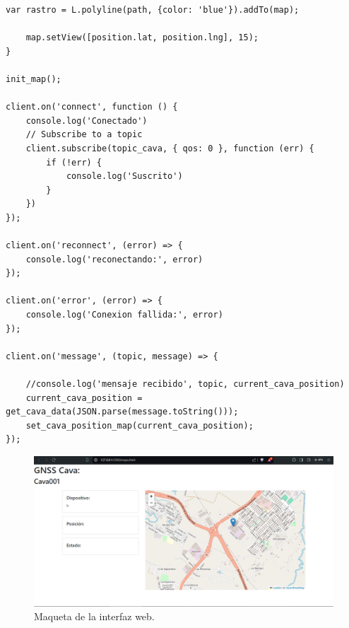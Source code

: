 \begin{lstlisting}[label=cod:aplicacion_web_js, caption=Implementación en javascript de la parte dinámica de la página web.]
    var rastro = L.polyline(path, {color: 'blue'}).addTo(map);

    map.setView([position.lat, position.lng], 15);
}

init_map();

client.on('connect', function () {
    console.log('Conectado')
    // Subscribe to a topic
    client.subscribe(topic_cava, { qos: 0 }, function (err) {
        if (!err) {
            console.log('Suscrito')
        }
    })
});

client.on('reconnect', (error) => {
    console.log('reconectando:', error)
});

client.on('error', (error) => {
    console.log('Conexion fallida:', error)
});

client.on('message', (topic, message) => {

    //console.log('mensaje recibido', topic, current_cava_position)
    current_cava_position = get_cava_data(JSON.parse(message.toString()));
    set_cava_position_map(current_cava_position);
});

\end{lstlisting}


\begin{figure}[htbp]
	\centering
	\includegraphics[width=1\textwidth]{./Figures/Mockup_web.png}
	\caption{Maqueta de la interfaz web.}
	\label{fig:mockup}
\end{figure}


